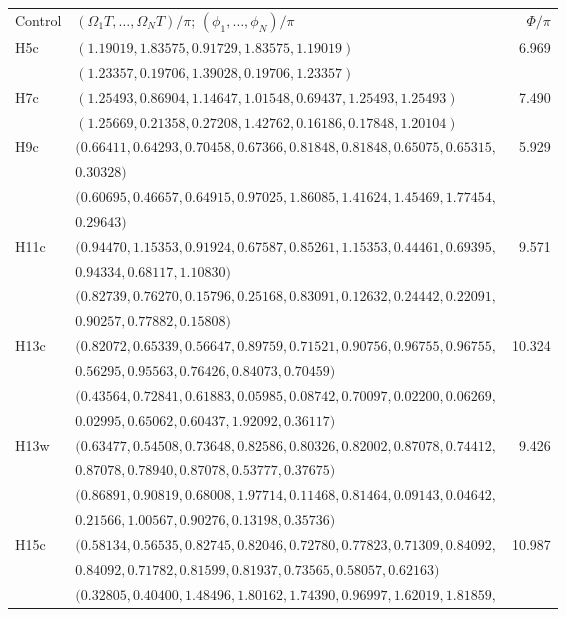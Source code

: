 \documentclass[10pt,aps,twocolumn,pra,floatfix,superscriptaddress]{revtex4-2}
\begin{document}
\begin{table}[tp]
\centering\small
\begin{ruledtabular}
\begin{tabular}{llr}
Control & $(\Omega_1T,\ldots,\Omega_NT)/\pi$; $(\phi_1,\ldots,\phi_N)/\pi$ & $\Phi/\pi$ \\
H5c & $(1.19019,1.83575,0.91729,1.83575,1.19019)$ & 6.969 \\
 & $(1.23357,0.19706,1.39028,0.19706,1.23357)$ &  \\
H7c & $(1.25493,0.86904,1.14647,1.01548,0.69437,1.25493,1.25493)$ & 7.490 \\
 & $(1.25669,0.21358,0.27208,1.42762,0.16186,0.17848,1.20104)$ &  \\
H9c & $(0.66411,0.64293,0.70458,0.67366,0.81848,0.81848,0.65075,0.65315,$ & 5.929 \\
 & $0.30328)$ &  \\
 & $(0.60695,0.46657,0.64915,0.97025,1.86085,1.41624,1.45469,1.77454,$ &  \\
 & $0.29643)$ &  \\
H11c & $(0.94470,1.15353,0.91924,0.67587,0.85261,1.15353,0.44461,0.69395,$ & 9.571 \\
 & $0.94334,0.68117,1.10830)$ &  \\
 & $(0.82739,0.76270,0.15796,0.25168,0.83091,0.12632,0.24442,0.22091,$ &  \\
 & $0.90257,0.77882,0.15808)$ &  \\
H13c & $(0.82072,0.65339,0.56647,0.89759,0.71521,0.90756,0.96755,0.96755,$ & 10.324 \\
 & $0.56295,0.95563,0.76426,0.84073,0.70459)$ &  \\
 & $(0.43564,0.72841,0.61883,0.05985,0.08742,0.70097,0.02200,0.06269,$ &  \\
 & $0.02995,0.65062,0.60437,1.92092,0.36117)$ &  \\
H13w & $(0.63477,0.54508,0.73648,0.82586,0.80326,0.82002,0.87078,0.74412,$ & 9.426 \\
 & $0.87078,0.78940,0.87078,0.53777,0.37675)$ &  \\
 & $(0.86891,0.90819,0.68008,1.97714,0.11468,0.81464,0.09143,0.04642,$ &  \\
 & $0.21566,1.00567,0.90276,0.13198,0.35736)$ &  \\
H15c & $(0.58134,0.56535,0.82745,0.82046,0.72780,0.77823,0.71309,0.84092,$ & 10.987 \\
 & $0.84092,0.71782,0.81599,0.81937,0.73565,0.58057,0.62163)$ &  \\
 & $(0.32805,0.40400,1.48496,1.80162,1.74390,0.96997,1.62019,1.81859,$ &  \\

\end{tabular}
\end{ruledtabular}
\end{table}
\end{document}
